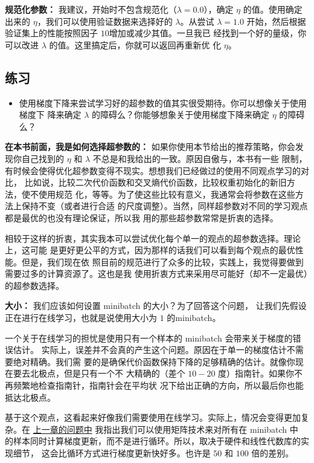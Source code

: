 \textbf{规范化参数：} 我建议，开始时不包含规范化（$\lambda=0.0$），确定 $\eta$
的值。使用确定出来的 $\eta$，我们可以使用验证数据来选择好的 $\lambda$。从尝试
$\lambda=1.0$ 开始，然后根据验证集上的性能按照因子 $10$增加或减少其值。一旦我已
经找到一个好的量级，你可以改进 $\lambda$ 的值。这里搞定后，你就可以返回再重新优
化 $\eta$。

\subsection*{练习}

\begin{itemize}
\item 使用梯度下降来尝试学习好的超参数的值其实很受期待。你可以想像关于使用梯度下
  降来确定 $\lambda$ 的障碍么？你能够想象关于使用梯度下降来确定 $\eta$ 的障碍么？
\end{itemize}

\textbf{在本书前面，我是如何选择超参数的：} 如果你使用本节给出的推荐策略，你会发
现你自己找到的 $\eta$ 和 $\lambda$ 不总是和我给出的一致。原因自傲与，本书有一些
限制，有时候会使得优化超参数变得不现实。想想我们已经做过的使用不同观点学习的对比，
比如说，比较二次代价函数和交叉熵代价函数，比较权重初始化的新旧方法，使不使用规范
化，等等。为了使这些比较有意义，我通常会将参数在这些方法上保持不变（或者进行合适
  的尺度调整）。当然，同样超参数对不同的学习观点都是最优的也没有理论保证，所以我
用的那些超参数常常是折衷的选择。

相较于这样的折衷，其实我本可以尝试优化每个单一的观点的超参数选择。理论上，这可能
是更好更公平的方式，因为那样的话我们可以看到每个观点的最优性能。但是，我们现在依
照目前的规范进行了众多的比较，实践上，我觉得要做到需要过多的计算资源了。这也是我
使用折衷方式来采用尽可能好（却不一定最优）的超参数选择。

\label{mini_batch_size}
\textbf{\minibatch{}大小：} 我们应该如何设置 minibatch 的大小？为了回答这个问题，
让我们先假设正在进行在线学习，也就是说使用大小为 $1$ 的minibatch。

一个关于在线学习的担忧是使用只有一个样本的 minibatch 会带来关于梯度的错误估计。
实际上，误差并不会真的产生这个问题。原因在于单一的梯度估计不需要绝对精确。我们需
要的是确保代价函数保持下降的足够精确的估计。就像你现在要去北极点，但是只有一个不
大精确的（差个 $10-20$ 度）指南针。如果你不再频繁地检查指南针，指南针会在平均状
况下给出正确的方向，所以最后你也能抵达北极点。

基于这个观点，这看起来好像我们需要使用在线学习。实际上，情况会变得更加复杂。在
\hyperref[ch:]{上一章的问题中} 我指出我们可以使用矩阵技术来对所有在 minibatch 中
的样本同时计算梯度更新，而不是进行循环。所以，取决于硬件和线性代数库的实现细节，
这会比循环方式进行梯度更新快好多。也许是 $50$ 和 $100$ 倍的差别。


